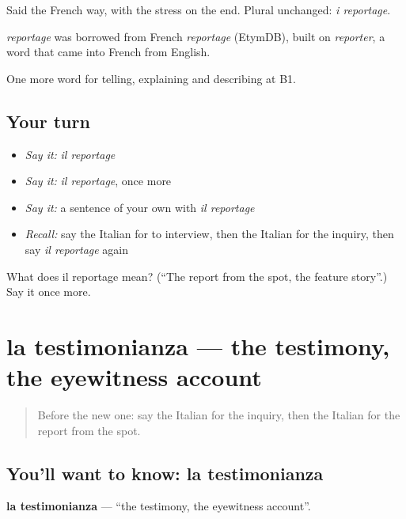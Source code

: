 Said the French way, with the stress on the end. Plural unchanged: \emph{i reportage}.

\begin{cousinweb}
\emph{reportage} was borrowed from French \emph{reportage} (EtymDB), built on \emph{reporter}, a word that came into French from English.
\end{cousinweb}

\begin{grammarlens}[title={What you've built}]
One more word for telling, explaining and describing at B1.
\end{grammarlens}

\subsection*{Your turn}
\begin{itemize}
\raggedright
  \item \emph{Say it:} \emph{il reportage}
  \item \emph{Say it:} \emph{il reportage}, once more
  \item \emph{Say it:} a sentence of your own with \emph{il reportage}
  \item \emph{Recall:} say the Italian for to interview, then the Italian for the inquiry, then say \emph{il reportage} again
\end{itemize}

\begin{tcolorbox}[breakable,colback=teal!4,colframe=teal!35!black,title={Before you move on}]
What does il reportage mean? (\textquotedblleft{}The report from the spot, the feature story\textquotedblright{}.) Say it once more.
\end{tcolorbox}
\section[la testimonianza]{la testimonianza — the testimony, the eyewitness account}

\label{lesson:IT-C284-testimonianza}



\begin{quote}
Before the new one: say the Italian for the inquiry, then the Italian for the report from the spot.
\end{quote}

\subsection*{You'll want to know: la testimonianza}
\textbf{la testimonianza} — \textquotedblleft{}the testimony, the eyewitness account\textquotedblright{}.

